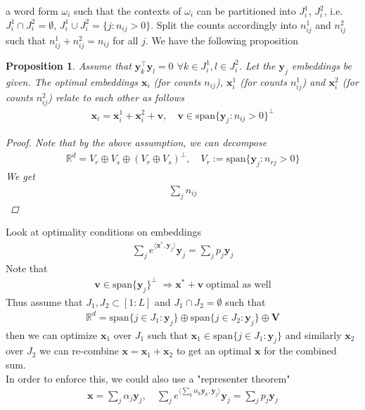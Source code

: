 \documentclass{article}
\renewcommand{\Re}{{\mathbb R}}
\newcommand{\x}{{\mathbf x}}
\newcommand{\y}{{\mathbf y}}
\newcommand{\word}{{\omega}}
\newtheorem{proposition}{Proposition}
\begin{document}
\newpage



a word form $\word_i$ such that the contexts of $\word_i$ can be partitioned into $J_i^1$, $J_i^2$, i.e.~$J_i^1 \cap J_i^2 = \emptyset$, $J_i^1 \cup J_i^2 = \{ j: n_{ij} >0\}$. Split the counts accordingly into $n_{ij}^1$ and $n_{ij}^2$ such that $n_{ij}^1 + n_{ij}^2 =n_{ij}$ for all $j$.  We have the following proposition 
\begin{proposition}
Assume that $\y_k^\top \y_l = 0$ $\forall k \in J^1_i, l \in J_i^2$. Let the $\y_j$ embeddings be given. The optimal embeddings $\x_i$ (for counts $n_{ij}$), $\x^1_i$ (for counts $n_{ij}^1$) and $\x^2_i$ (for counts $n_{ij}^2$) relate to each other as follows
\begin{align}
\x_i = \x_i^1 + \x_i^2 + \mathbf v, \quad \mathbf v \in \text{span}\{\y_j: n_{ij}>0\}^\perp
\end{align}
\begin{proof}
Note that by the above assumption, we can decompose
\begin{align}
\Re^d = V_r \oplus V_s  \oplus (V_r \oplus V_s)^\perp, \quad 
V_r := \text{span}\{ \y_j: n_{rj}>0\} 
\end{align}
We get 
\begin{align}
\sum_{j} n_{ij} 
\end{align}
\end{proof}
\end{proposition} 

\newpage




Look at optimality conditions on embeddings 
\begin{align}
\sum_{j} e^{\langle \x^*, \y_j \rangle}\y_j = \sum_{j} p_j \y_j 
\end{align}
Note that 
\begin{align}
\mathbf v \in \text{span}\{\y_j\}^\perp \; \Longrightarrow \x^* + \mathbf v \; \text{optimal as well}
\end{align}
Thus assume that $J_1, J_2 \subset [1:L]$ and $J_1 \cap J_2 = \emptyset$ such that
\begin{align}
\Re^d = \text{span} \{ j \in J_1: \y_j\} \oplus \text{span}\{ j \in J_2: \y_j\} \oplus \mathbf V
\end{align}
then we can optimize $\x_1$ over $J_1$ such that $\x_1 \in \text{span} \{ j \in J_1: \y_j\}$ and similarly $\x_2$ over $J_2$ we can re-combine $\x = \x_1 + \x_2$ to get an optimal $\x$ for the combined sum. \\

In order to enforce this, we could also use a "representer theorem" 
\begin{align}
\x = \sum_{j} \alpha_j \y_j, \quad  
\sum_j e^{\langle \sum_{k} \alpha_k \y_k, \y_j \rangle} \y_j = \sum_j p_j \y_j 
\end{align}



\end{document}
